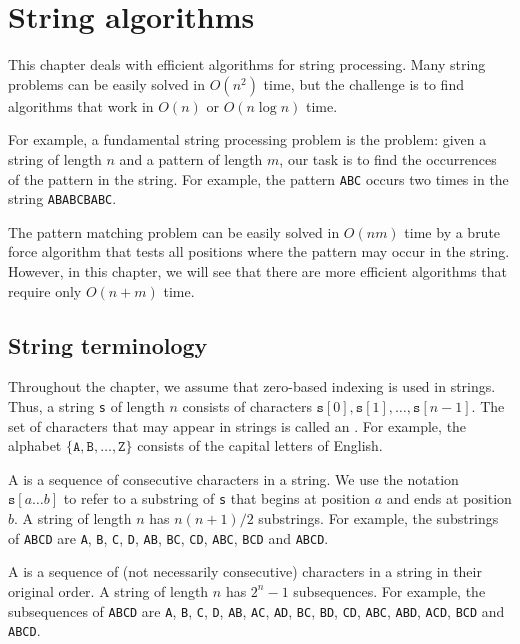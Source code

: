 \chapter{String algorithms}

This chapter deals with efficient algorithms
for string processing.
Many string problems can be easily solved
in $O(n^2)$ time, but the challenge is to
find algorithms that work in $O(n)$ or $O(n \log n)$
time.


For example, a fundamental string processing
problem is the  problem:
given a string of length $n$ and a pattern of length $m$,
our task is to find the occurrences of the pattern
in the string.
For example, the pattern \texttt{ABC} occurs two
times in the string \texttt{ABABCBABC}.

The pattern matching problem can be easily solved
in $O(nm)$ time by a brute force algorithm that
tests all positions where the pattern may
occur in the string.
However, in this chapter, we will see that there
are more efficient algorithms that require only
$O(n+m)$ time.


\section{String terminology}


Throughout the chapter, we assume that
zero-based indexing is used in strings.
Thus, a string \texttt{s} of length $n$
consists of characters
$\texttt{s}[0],\texttt{s}[1],\ldots,\texttt{s}[n-1]$.
The set of characters that may appear
in strings is called an .
For example, the alphabet
$\{\texttt{A},\texttt{B},\ldots,\texttt{Z}\}$
consists of the capital letters of English.


A  is a sequence of consecutive
characters in a string.
We use the notation $\texttt{s}[a \ldots b]$
to refer to a substring of \texttt{s}
that begins at position $a$ and ends at position $b$.
A string of length $n$ has $n(n+1)/2$ substrings.
For example, the substrings of
\texttt{ABCD} are
\texttt{A}, \texttt{B}, \texttt{C}, \texttt{D},
\texttt{AB}, \texttt{BC}, \texttt{CD},
\texttt{ABC}, \texttt{BCD} and \texttt{ABCD}.


A  is a sequence of
(not necessarily consecutive) characters
in a string in their original order.
A string of length $n$ has $2^n-1$ subsequences.
For example, the subsequences of
\texttt{ABCD} are
\texttt{A}, \texttt{B}, \texttt{C}, \texttt{D},
\texttt{AB}, \texttt{AC}, \texttt{AD},
\texttt{BC}, \texttt{BD}, \texttt{CD},
\texttt{ABC}, \texttt{ABD}, \texttt{ACD},
\texttt{BCD} and \texttt{ABCD}.

